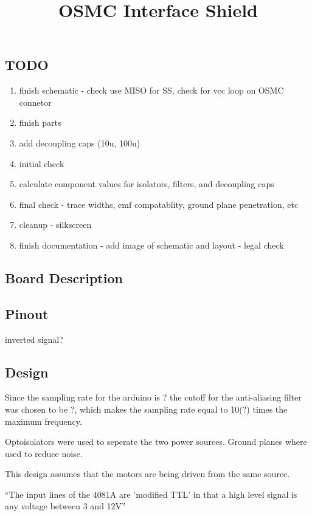 \documentclass[letterpaper,12pt,notitlepage]{report}
\begin{document}
\title{OSMC Interface Shield}
\author{}
\date{}
\maketitle

\subsection{TODO}
\begin{enumerate}
 \item finish schematic - check use MISO for SS, check for vcc loop on OSMC connetor
 \item finish parts
 \item add decoupling caps (10u, 100u)
 \item initial check
 \item calculate component values for isolators, filters, and decoupling caps
 \item final check - trace widths, emf compatablity, ground plane penetration, etc
 \item cleanup - silkscreen
 \item finish documentation - add image of schematic and layout - legal check
\end{enumerate}

\subsection{Board Description}

\subsection{Pinout}

inverted signal?

\subsection{Design}

Since the sampling rate for the arduino is ? the cutoff for the anti-aliasing filter was chosen to be ?, which makes the sampling rate equal to 10(?) times the maximum frequency.

Optoisolators were used to seperate the two power sources.  Ground planes where used to reduce noise.

This design assumes that the motors are being driven from the same source.

\textquotedblleft The input lines of the 4081A are 'modified TTL' in that a high level signal is any voltage between 3 and 12V\textquotedblright
\end{document}
